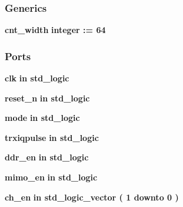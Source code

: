 \subsubsection*{Generics}
 \begin{DoxyCompactItemize}
\item 
{\bf cnt\+\_\+width} {\bfseries {\bfseries \textcolor{comment}{integer}\textcolor{vhdlchar}{ }\textcolor{vhdlchar}{ }\textcolor{vhdlchar}{\+:}\textcolor{vhdlchar}{=}\textcolor{vhdlchar}{ }\textcolor{vhdlchar}{ } \textcolor{vhdldigit}{64} \textcolor{vhdlchar}{ }}}
\end{DoxyCompactItemize}
\subsubsection*{Ports}
 \begin{DoxyCompactItemize}
\item 
{\bf clk}  {\bfseries {\bfseries \textcolor{keywordflow}{in}\textcolor{vhdlchar}{ }}} {\bfseries \textcolor{comment}{std\+\_\+logic}\textcolor{vhdlchar}{ }} 
\item 
{\bf reset\+\_\+n}  {\bfseries {\bfseries \textcolor{keywordflow}{in}\textcolor{vhdlchar}{ }}} {\bfseries \textcolor{comment}{std\+\_\+logic}\textcolor{vhdlchar}{ }} 
\item 
{\bf mode}  {\bfseries {\bfseries \textcolor{keywordflow}{in}\textcolor{vhdlchar}{ }}} {\bfseries \textcolor{comment}{std\+\_\+logic}\textcolor{vhdlchar}{ }} 
\item 
{\bf trxiqpulse}  {\bfseries {\bfseries \textcolor{keywordflow}{in}\textcolor{vhdlchar}{ }}} {\bfseries \textcolor{comment}{std\+\_\+logic}\textcolor{vhdlchar}{ }} 
\item 
{\bf ddr\+\_\+en}  {\bfseries {\bfseries \textcolor{keywordflow}{in}\textcolor{vhdlchar}{ }}} {\bfseries \textcolor{comment}{std\+\_\+logic}\textcolor{vhdlchar}{ }} 
\item 
{\bf mimo\+\_\+en}  {\bfseries {\bfseries \textcolor{keywordflow}{in}\textcolor{vhdlchar}{ }}} {\bfseries \textcolor{comment}{std\+\_\+logic}\textcolor{vhdlchar}{ }} 
\item 
{\bf ch\+\_\+en}  {\bfseries {\bfseries \textcolor{keywordflow}{in}\textcolor{vhdlchar}{ }}} {\bfseries \textcolor{comment}{std\+\_\+logic\+\_\+vector}\textcolor{vhdlchar}{ }\textcolor{vhdlchar}{(}\textcolor{vhdlchar}{ }\textcolor{vhdlchar}{ } \textcolor{vhdldigit}{1} \textcolor{vhdlchar}{ }\textcolor{keywordflow}{downto}\textcolor{vhdlchar}{ }\textcolor{vhdlchar}{ } \textcolor{vhdldigit}{0} \textcolor{vhdlchar}{ }\textcolor{vhdlchar}{)}\textcolor{vhdlchar}{ }} 

\end{DoxyCompactItemize}
